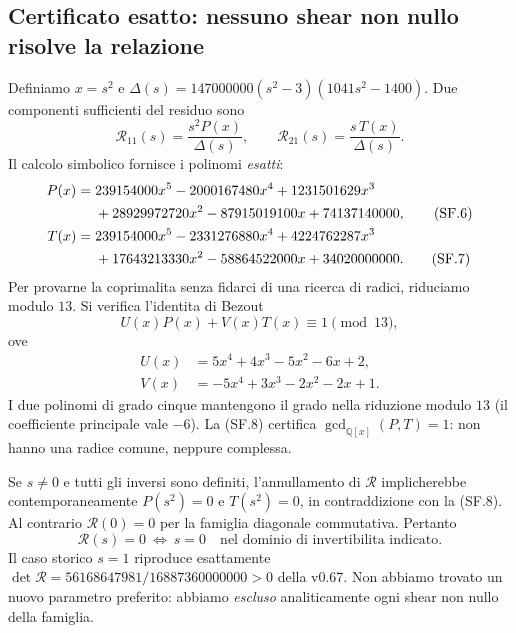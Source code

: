 \documentclass[11pt,a4paper]{article}
\begin{document}
\subsection*{Certificato esatto: nessuno shear non nullo risolve la relazione}
Definiamo $x=s^2$ e $\Delta(s)=147000000(s^2-3)(1041s^2-1400)$. Due componenti sufficienti del residuo sono
\begin{equation}
\boxed{\mathcal R_{11}(s)=\frac{s^2P(x)}{\Delta(s)},\qquad
\mathcal R_{21}(s)=\frac{s\,T(x)}{\Delta(s)}.}\tag{SF.5}
\end{equation}
Il calcolo simbolico fornisce i polinomi \emph{esatti}:
\begin{align}
P(x)={}&239154000x^5-2000167480x^4+1231501629x^3\notag\\
&+28929972720x^2-87915019100x+74137140000,\tag{SF.6}\\
T(x)={}&239154000x^5-2331276880x^4+4224762287x^3\notag\\
&+17643213330x^2-58864522000x+34020000000.\tag{SF.7}
\end{align}
Per provarne la coprimalita senza fidarci di una ricerca di radici, riduciamo modulo $13$. Si verifica l'identita di Bezout
\begin{equation}
\boxed{U(x)P(x)+V(x)T(x)\equiv1\pmod {13},}\tag{SF.8}
\end{equation}
ove
\begin{align*}
U(x)&=5x^4+4x^3-5x^2-6x+2,\\
V(x)&=-5x^4+3x^3-2x^2-2x+1.
\end{align*}
I due polinomi di grado cinque mantengono il grado nella riduzione modulo $13$ (il coefficiente principale vale $-6$). La (SF.8) certifica $\gcd_{\mathbb Q[x]}(P,T)=1$: non hanno una radice comune, neppure complessa.

Se $s\ne0$ e tutti gli inversi sono definiti, l'annullamento di $\mathcal R$ implicherebbe contemporaneamente $P(s^2)=0$ e $T(s^2)=0$, in contraddizione con la (SF.8). Al contrario $\mathcal R(0)=0$ per la famiglia diagonale commutativa. Pertanto
\begin{equation}
\boxed{\mathcal R(s)=0\ \Longleftrightarrow\ s=0\quad
\text{nel dominio di invertibilita indicato}.}\tag{SF.9}
\end{equation}
Il caso storico $s=1$ riproduce esattamente $\det\mathcal R=56168647981/16887360000000>0$ della v0.67. Non abbiamo trovato un nuovo parametro preferito: abbiamo \emph{escluso} analiticamente ogni shear non nullo della famiglia.

\clearpage
\end{document}
